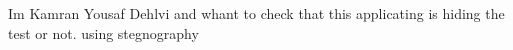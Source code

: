 Im Kamran Yousaf Dehlvi and whant to check that this applicating is hiding the test or not. using stegnography
